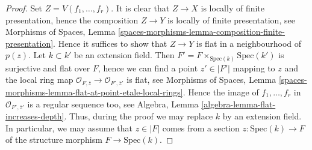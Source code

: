 \begin{proof}
Set $Z = V(f_1, \ldots, f_r)$. It is clear that $Z \to X$ is locally of
finite presentation, hence the composition $Z \to Y$ is locally of finite
presentation, see
Morphisms of Spaces,
Lemma \ref{spaces-morphisms-lemma-composition-finite-presentation}.
Hence it suffices to show that $Z \to Y$ is flat in a neighbourhood of $p(z)$.
Let $k \subset k'$ be an extension field. Then
$F' = F \times_{\text{Spec}(k)} \text{Spec}(k')$ is surjective and
flat over $F$, hence we can find a point $z' \in |F'|$ mapping to $z$
and the local ring map
$\mathcal{O}_{F, \overline{z}} \to \mathcal{O}_{F', \overline{z}'}$ is
flat, see
Morphisms of Spaces,
Lemma \ref{spaces-morphisms-lemma-flat-at-point-etale-local-rings}.
Hence the image of $f_1, \ldots, f_r$ in
$\mathcal{O}_{F', \overline{z}'}$ is a regular sequence too, see
Algebra, Lemma \ref{algebra-lemma-flat-increases-depth}.
Thus, during the proof we may replace $k$ by an extension field.
In particular, we may assume that $z \in |F|$ comes from a section
$z : \text{Spec}(k) \to F$ of the structure morphism $F \to \text{Spec}(k)$.


\end{proof}
